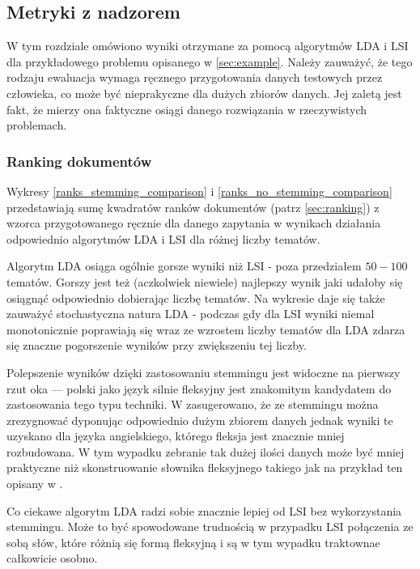 \documentclass[11pt,a4paper]{article}
\begin{document}
\FloatBarrier

\subsection{Metryki z nadzorem}

W tym rozdziale omówiono wyniki otrzymane za pomocą algorytmów LDA i LSI dla
przykładowego problemu opisanego w \ref{sec:example}. Należy zauważyć, że tego
rodzaju ewaluacja wymaga ręcznego przygotowania danych testowych przez
człowieka, co może być nieprakyczne dla dużych zbiorów danych.  Jej zaletą jest
fakt, że mierzy ona faktyczne osiągi danego rozwiązania w rzeczywistych
problemach.

\subsubsection{Ranking dokumentów}

Wykresy \ref{ranks_stemming_comparison} i \ref{ranks_no_stemming_comparison}
przedstawiają sumę kwadratów ranków dokumentów (patrz \ref{sec:ranking}) z
wzorca przygotowanego ręcznie dla danego zapytania w wynikach działania
odpowiednio algorytmów LDA i LSI dla różnej liczby tematów.

Algorytm LDA osiąga ogólnie gorsze wyniki niż LSI - poza przedziałem $50 - 100$
tematów. Gorszy jest też (aczkolwiek niewiele) najlepszy wynik jaki udałoby się
osiągnąć odpowiednio dobierając liczbę tematów. Na wykresie daje się także
zauważyć stochastyczna natura LDA - podczas gdy dla LSI wyniki niemal
monotonicznie poprawiają się wraz ze wzrostem liczby tematów dla LDA zdarza się
znaczne pogorszenie wyników przy zwiększeniu tej liczby.

Polepszenie wyników dzięki zastosowaniu stemmingu jest widoczne na pierwszy
rzut oka --- polski jako język silnie fleksyjny jest znakomitym kandydatem do
zastosowania tego typu techniki. W \cite{manning-schuetze} zasugerowano, że ze
stemmingu można zrezygnować dyponując odpowiednio dużym zbiorem danych jednak
wyniki te uzyskano dla języka angielskiego, którego fleksja jest znacznie mniej
rozbudowana. W tym wypadku zebranie tak dużej ilości danych może być mniej
praktyczne niż skonstruowanie słownika fleksyjnego takiego jak na przykład ten
opisany w \cite{lubaszewski-slownik}.

Co ciekawe algorytm LDA radzi sobie znacznie lepiej od LSI bez wykorzystania
stemmingu.  Może to być spowodowane trudnością w przypadku LSI połączenia ze
sobą słów, które różnią się formą fleksyjną i są w tym wypadku traktownae
całkowicie osobno.
\end{document}
